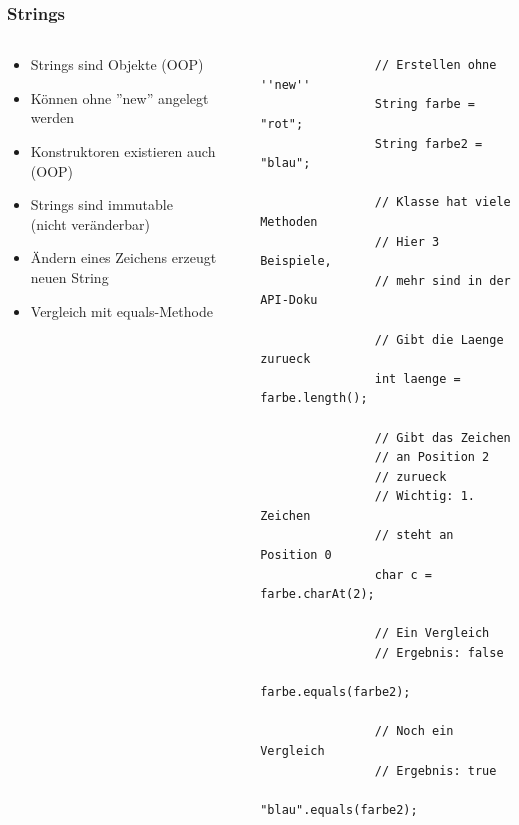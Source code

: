 \begin{frame}[fragile]
	  \frametitle{Strings}
		 \begin{columns}
		 \begin{column}{0.5\textwidth}
			  \small
			  \begin{itemize}
			    \item Strings sind Objekte (OOP)
			    \item Können ohne ''new'' angelegt werden
			    \item Konstruktoren existieren auch (OOP)
			    \item Strings sind immutable\\
			    (nicht veränderbar)
			    \item Ändern eines Zeichens erzeugt neuen
			    String
			    \item Vergleich mit equals-Methode
			  \end{itemize}
		 \end{column}
		 \begin{column}{0.5\textwidth}
		 	\begin{lstlisting}
		 		// Erstellen ohne ''new''
		 		String farbe = "rot";
		 		String farbe2 = "blau";
		 		
    			// Klasse hat viele Methoden
    			// Hier 3 Beispiele,
    			// mehr sind in der API-Doku

		 		// Gibt die Laenge zurueck
		 		int laenge = farbe.length();
		 		
		 		// Gibt das Zeichen 
		 		// an Position 2
		 		// zurueck
		 		// Wichtig: 1. Zeichen
		 		// steht an Position 0
		 		char c = farbe.charAt(2);
		 		
		 		// Ein Vergleich
		 		// Ergebnis: false
		 		farbe.equals(farbe2);
		 		
		 		// Noch ein Vergleich
		 		// Ergebnis: true
		 		"blau".equals(farbe2);
		 	\end{lstlisting}
		 \end{column}
		 \end{columns}
\end{frame}

